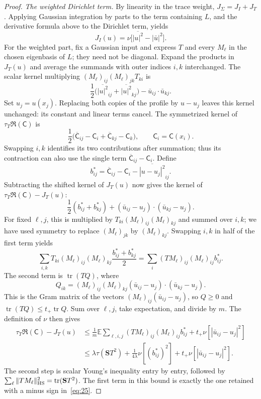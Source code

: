 \begin{proof}
\smallskip\noindent\emph{The weighted Dirichlet term.}
By linearity in the trace weight, \(J_\Sigma=J_I+J_T\).  Applying Gaussian
integration by parts to the term containing \(L\), and the derivative
formula above to the Dirichlet term, yields
\[
 J_I(u)=\nu\bigl[\overline{|u|^2}-|\bar u|^2\bigr].
\]
For the weighted part, fix a Gaussian input and express \(T\) and every
\(M_\ell\) in the chosen eigenbasis of \(L\); they need not be diagonal.
Expand the products in \(J_T(u)\) and average the summands with outer
indices \(i,k\) interchanged. The scalar kernel multiplying
\((M_\ell)_{ij}(M_\ell)_{jk}T_{ki}\) is
\[
 \frac12\bigl(\overline{|u|^2}_{ij}
                 +\overline{|u|^2}_{kj}\bigr)
          -\bar u_{ij}\cdot\bar u_{kj}.
\]
Set \(u_j=u(x_j)\).  Replacing both copies of the profile by \(u-u_j\)
leaves this kernel unchanged: its constant and linear terms cancel.
The symmetrized kernel of \(\tau_T\mathfrak R(\mathsf C)\) is
\[
 \frac12\bigl(\overline{\mathsf C}_{ij}-\mathsf C_i
              +\overline{\mathsf C}_{kj}-\mathsf C_k\bigr),
 \qquad \mathsf C_i=\mathsf C(x_i).
\]
Swapping \(i,k\) identifies its two contributions after summation;
thus its contraction can also use the single term
\(\overline{\mathsf C}_{ij}-\mathsf C_i\). Define
\[
 b_{ij}^*=\overline{\mathsf C}_{ij}-\mathsf C_i
                         -\overline{|u-u_j|^2}_{ij}.
\]
Subtracting the shifted kernel of \(J_T(u)\) now gives the kernel of
\(\tau_T\mathfrak R(\mathsf C)-J_T(u)\):
\[
 \frac12(b_{ij}^*+b_{kj}^*)
       +(\bar u_{ij}-u_j)\cdot(\bar u_{kj}-u_j).
\]
For fixed \(\ell,j\), this is multiplied by
\(T_{ki}(M_\ell)_{ij}(M_\ell)_{kj}\) and summed over \(i,k\);
we have used symmetry to replace \((M_\ell)_{jk}\) by
\((M_\ell)_{kj}\). Swapping \(i,k\) in half of the first term yields
\[
 \sum_{i,k}T_{ki}(M_\ell)_{ij}(M_\ell)_{kj}
       \frac{b_{ij}^*+b_{kj}^*}{2}
   =\sum_i(TM_\ell)_{ij}(M_\ell)_{ij}b_{ij}^*.
\]
The second term is \(\operatorname{tr}(TQ)\), where
\[
 Q_{ik}=(M_\ell)_{ij}(M_\ell)_{kj}
             (\bar u_{ij}-u_j)\cdot(\bar u_{kj}-u_j).
\]
This is the Gram matrix of the vectors
\((M_\ell)_{ij}(\bar u_{ij}-u_j)\), so \(Q\ge0\) and
\(\operatorname{tr}(TQ)\le t_+\operatorname{tr}Q\).
Sum over \(\ell,j\), take expectation, and divide by \(m\).
The definition of \(\nu\) then gives
\[
 \begin{aligned}
 \tau_T\mathfrak R(\mathsf C)-J_T(u)
 &\le\frac1m\mathbb E\sum_{\ell,i,j}
       (TM_\ell)_{ij}(M_\ell)_{ij}b_{ij}^*
             +t_+\nu[|\bar u_{ij}-u_j|^2]\\
 &\le\lambda\tau(\mathbf S T^2)
          +\frac1{4\lambda}\nu[(b_{ij}^*)^2]
          +t_+\nu[|\bar u_{ij}-u_j|^2].
 \end{aligned}
 \tag{26}\label{eq:26}
\]
The second step is scalar Young's inequality entry by entry, followed by
\(\sum_\ell\|TM_\ell\|_{\rm HS}^2
 =\operatorname{tr}(\mathbf S T^2)\).
The first term in this bound is exactly the one retained with a minus
sign in~\eqref{eq:25}.


\end{proof}
